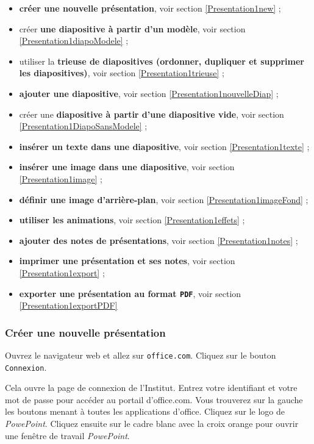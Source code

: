 \begin{itemize}   
\item \textbf{créer une nouvelle présentation}, voir section \vref{Presentation1new} ;
\item créer \textbf{une diapositive à partir d'un modèle}, voir section \vref{Presentation1diapoModele} ;
\item utiliser la \textbf{trieuse de diapositives (ordonner, dupliquer et supprimer les diapositives)}, voir section \vref{Presentation1trieuse} ;
\item \textbf{ajouter une diapositive}, voir section \vref{Presentation1nouvelleDiap} ;
\item créer une \textbf{diapositive à partir d'une diapositive vide}, voir section \vref{Presentation1DiapoSansModele} ;
\item \textbf{insérer un texte dans une diapositive}, voir section \vref{Presentation1texte} ;
\item \textbf{insérer une image dans une diapositive}, voir section \vref{Presentation1image} ;
\item \textbf{définir une image d'arrière-plan}, voir section \vref{Presentation1imageFond} ;
\item \textbf{utiliser les animations}, voir section \vref{Presentation1effets} ;

\item \textbf{ajouter des notes de présentations}, voir section \vref{Presentation1notes} ;
\item \textbf{imprimer une présentation et ses notes}, voir section \vref{Presentation1export} ;
\item \textbf{exporter une présentation au format \texttt{PDF}}, voir section \vref{Presentation1exportPDF} 
\end{itemize}  





\subsubsection{Créer une nouvelle présentation}\label{Presentation1new}

Ouvrez le navigateur web et allez sur \texttt{office.com}. Cliquez sur le bouton \texttt{Connexion}.


Cela ouvre la page de connexion de l'Institut. Entrez votre identifiant et votre mot de passe pour accéder au portail d'office.com. Vous trouverez sur la gauche les boutons menant à toutes les applications d'office. Cliquez sur le logo de \emph{PowePoint}. Cliquez ensuite sur le cadre blanc avec la croix orange pour ouvrir une fenêtre de travail \emph{PowePoint}.

